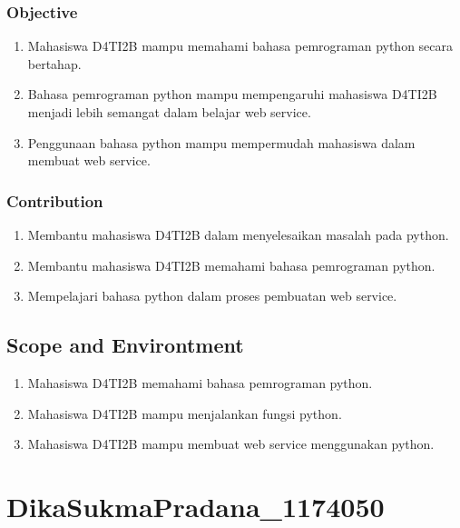 \subsubsection{Objective}
\begin{enumerate}
	\item Mahasiswa D4TI2B mampu memahami bahasa pemrograman python secara bertahap.
	\item Bahasa pemrograman python mampu mempengaruhi mahasiswa D4TI2B menjadi lebih semangat dalam belajar web service.
	\item Penggunaan bahasa python mampu mempermudah mahasiswa dalam membuat web service.
\end{enumerate}
\subsubsection{Contribution}
\begin{enumerate}
	\item Membantu mahasiswa D4TI2B dalam menyelesaikan masalah pada python.
	\item Membantu mahasiswa D4TI2B memahami bahasa pemrograman python.
	\item Mempelajari bahasa python dalam proses pembuatan web service.
\end{enumerate}
		
\subsection{Scope and Environtment}
\begin{enumerate}
	\item Mahasiswa D4TI2B memahami bahasa pemrograman python.
	\item Mahasiswa D4TI2B mampu menjalankan fungsi python.
	\item Mahasiswa D4TI2B mampu membuat web service menggunakan python.
\end{enumerate}

\section{DikaSukmaPradana\_1174050}
